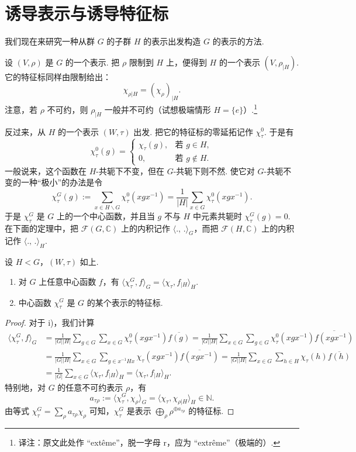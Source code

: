 \section{诱导表示与诱导特征标}\label{sec:fg-4-3}

我们现在来研究一种从群 $G$ 的子群 $H$ 的表示出发构造 $G$ 的表示的方法.

\begin{numpara}[特征标的观点]\label{np:fg-4-3-1}
设 $(V,\rho)$ 是 $G$ 的一个表示. 把 $\rho$ 限制到 $H$ 上，便得到 $H$ 的一个表示 $(V,\rho_{|H})$. 它的特征标同样由限制给出：
\[
\chi_{\rho|H}=(\chi_\rho)_{|H}.
\]
注意，若 $\rho$ 不可约，则 $\rho_{|H}$ 一般并不可约（试想极端情形 $H=\{e\}$）.\footnote{译注：原文此处作 ``ext\^eme''，脱一字母 r，应为 ``extr\^eme''（极端的）.}

反过来，从 $H$ 的一个表示 $(W,\tau)$ 出发. 把它的特征标的零延拓记作 $\chi_\tau^0$. 于是有
\[
\chi_\tau^0(g)=\begin{cases}\chi_\tau(g), & \text{若 } g\in H,\\ 0, & \text{若 } g\notin H.\end{cases}
\]
一般说来，这个函数在 $H$-共轭下不变，但在 $G$-共轭下则不然. 使它对 $G$-共轭不变的一种``极小''的办法是令
\[
\chi_\tau^G(g):=\sum_{x\in H\backslash G}\chi_\tau^0(xgx^{-1})=\frac{1}{|H|}\sum_{x\in G}\chi_\tau^0(xgx^{-1}).
\]
于是 $\chi_\tau^G$ 是 $G$ 上的一个中心函数，并且当 $g$ 不与 $H$ 中元素共轭时 $\chi_\tau^G(g)=0$. 在下面的定理中，把 $\mathcal{F}(G,\mathbb{C})$ 上的内积记作 $\langle.,\,.\rangle_G$，而把 $\mathcal{F}(H,\mathbb{C})$ 上的内积记作 $\langle.,\,.\rangle_H$.
\end{numpara}

\begin{theorem*}
设 $H<G$，$(W,\tau)$ 如上.
\begin{enumerate}[label=\roman*)]
\item 对 $G$ 上任意中心函数 $f$，有 $\langle\chi_\tau^G,f\rangle_G=\langle\chi_\tau,f_{|H}\rangle_H$.
\item 中心函数 $\chi_\tau^G$ 是 $G$ 的某个表示的特征标.
\end{enumerate}
\end{theorem*}
\begin{proof}
对于 i)，我们计算
\begin{align*}
\langle\chi_\tau^G,f\rangle_G
&=\frac{1}{|G||H|}\sum_{g\in G}\sum_{x\in G}\chi_\tau^0(xgx^{-1})\overline{f(g)}
=\frac{1}{|G||H|}\sum_{x\in G}\sum_{g\in G}\chi_\tau^0(xgx^{-1})\overline{f(xgx^{-1})}\\
&=\frac{1}{|G||H|}\sum_{x\in G}\sum_{g\in x^{-1}Hx}\chi_\tau(xgx^{-1})\overline{f(xgx^{-1})}
=\frac{1}{|G||H|}\sum_{x\in G}\sum_{h\in H}\chi_\tau(h)\overline{f(h)}\\
&=\frac{1}{|G|}\sum_{x\in G}\langle\chi_\tau,f_{|H}\rangle_H=\langle\chi_\tau,f_{|H}\rangle_H.
\end{align*}
特别地，对 $G$ 的任意不可约表示 $\rho$，有
\[
a_{\tau\rho}:=\langle\chi_\tau^G,\chi_\rho\rangle_G=\langle\chi_\tau,\chi_{\rho|H}\rangle_H\in\mathbb{N}.
\]
由等式 $\chi_\tau^G=\sum_\rho a_{\tau\rho}\chi_\rho$ 可知，$\chi_\tau^G$ 是表示 $\bigoplus_\rho\rho^{\oplus a_{\tau\rho}}$ 的特征标.
\end{proof}

